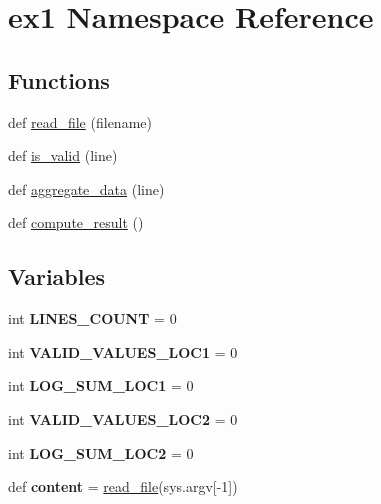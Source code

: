 \hypertarget{namespaceex1}{}\section{ex1 Namespace Reference}
\label{namespaceex1}
\subsection*{Functions}
\begin{DoxyCompactItemize}
\item 
def \hyperlink{namespaceex1_a47279d236411a393dd670d53f01534bb}{read\+\_\+file} (filename)
\item 
def \hyperlink{namespaceex1_a7225290cae6386f5a1114cfffdd698b6}{is\+\_\+valid} (line)
\item 
def \hyperlink{namespaceex1_aec8e1403e8459e0e3e246434aaf5e81c}{aggregate\+\_\+data} (line)
\item 
def \hyperlink{namespaceex1_a5ecbebd2f233a7ee96f79960cb134a56}{compute\+\_\+result} ()
\end{DoxyCompactItemize}
\subsection*{Variables}
\begin{DoxyCompactItemize}
\item 
\mbox{\label{namespaceex1_a9fd19999831fcd0aa3118f06e5a60707}} 
int {\bfseries L\+I\+N\+E\+S\+\_\+\+C\+O\+U\+NT} = 0
\item 
\mbox{\label{namespaceex1_a344c730293791bf47d02595658ff560c}} 
int {\bfseries V\+A\+L\+I\+D\+\_\+\+V\+A\+L\+U\+E\+S\+\_\+\+L\+O\+C1} = 0
\item 
\mbox{\label{namespaceex1_a10e04b6a3c68948cad47856db1ad6c08}} 
int {\bfseries L\+O\+G\+\_\+\+S\+U\+M\+\_\+\+L\+O\+C1} = 0
\item 
\mbox{\label{namespaceex1_a255a91989c731cb54c32455ee4aeba4b}} 
int {\bfseries V\+A\+L\+I\+D\+\_\+\+V\+A\+L\+U\+E\+S\+\_\+\+L\+O\+C2} = 0
\item 
\mbox{\label{namespaceex1_a1cfc9265dbc682a8f1c749af7dfd8c6b}} 
int {\bfseries L\+O\+G\+\_\+\+S\+U\+M\+\_\+\+L\+O\+C2} = 0
\item 
\mbox{\label{namespaceex1_a4e66d9120cff9135b642335398ed686a}} 
def {\bfseries content} = \hyperlink{namespaceex1_a47279d236411a393dd670d53f01534bb}{read\+\_\+file}(sys.\+argv\mbox{[}-\/1\mbox{]})
\end{DoxyCompactItemize}


